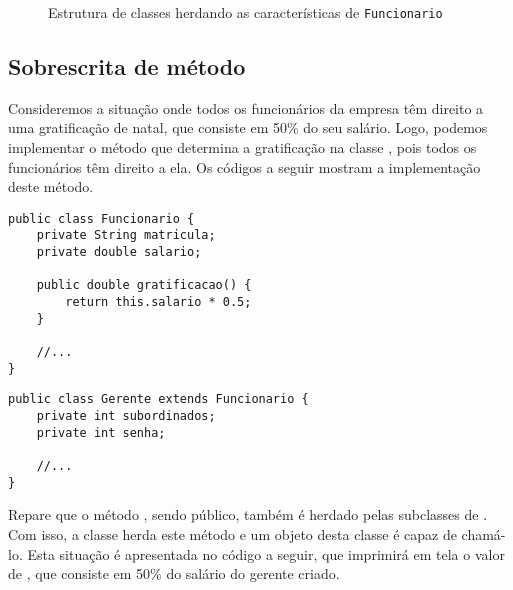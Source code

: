 \begin{figure}[h]
	\centering
	
	
	\caption{Estrutura de classes herdando as características de \texttt{Funcionario}}
	\label{fig:heranca-funcionario-varios}
\end{figure}
 

\subsection{Sobrescrita de método}

Consideremos a situação onde todos os funcionários da empresa têm direito a uma gratificação de natal, que consiste em 50\% do seu salário. Logo, podemos implementar o método que determina a gratificação na classe , pois todos os funcionários têm direito a ela. Os códigos a seguir mostram a implementação deste método. 
 
\begin{verbatim}
public class Funcionario {
	private String matricula;
	private double salario;

	public double gratificacao() {
		return this.salario * 0.5;
	}

	//...
}
\end{verbatim}
 
\begin{verbatim}
public class Gerente extends Funcionario {
	private int subordinados;
	private int senha;

	//...
}
\end{verbatim}
 
Repare que o método , sendo público, também é herdado pelas subclasses de . Com isso, a classe  herda este método e um objeto desta classe é capaz de chamá-lo. Esta situação é apresentada no código a seguir, que imprimirá em tela o valor de , que consiste em 50\% do salário do gerente criado.
 

